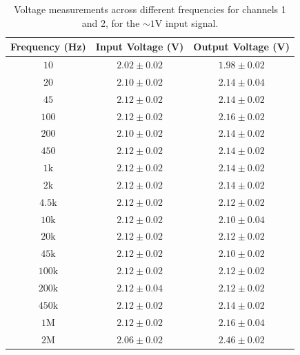 \documentclass[11pt]{article}
\begin{document}
\begin{table}[H]
	\centering
	\begin{tabular}{|c|c|c|}
	\hline
	Frequency (Hz) & Input Voltage (V) & Output Voltage (V)\\
	\hline
	$10$ & $2.02 \pm 0.02$ & $1.98 \pm 0.02$ \\
	$20$ & $2.10 \pm 0.02$ & $2.14 \pm 0.04$ \\
	$45$ & $2.12 \pm 0.02$ & $2.14 \pm 0.02$ \\
	$100$ & $2.12 \pm 0.02$ & $2.16 \pm 0.02$ \\
	$200$ & $2.10 \pm 0.02$ & $2.14 \pm 0.02$ \\
	$450$ & $2.12 \pm 0.02$ & $2.14 \pm 0.02$ \\
	$1\text{k}$ & $2.12 \pm 0.02$ & $2.14 \pm 0.02$ \\
	$2\text{k}$ & $2.12 \pm 0.02$ & $2.14 \pm 0.02$ \\
	$4.5\text{k}$ & $2.12 \pm 0.02$ & $2.12 \pm 0.02$ \\
	$10\text{k}$ & $2.12 \pm 0.02$ & $2.10 \pm 0.04$ \\
	$20\text{k}$ & $2.12 \pm 0.02$ & $2.12 \pm 0.02$ \\
	$45\text{k}$ & $2.12 \pm 0.02$ & $2.10 \pm 0.02$ \\
	$100\text{k}$ & $2.12 \pm 0.02$ & $2.12 \pm 0.02$ \\
	$200\text{k}$ & $2.12 \pm 0.04$ & $2.12 \pm 0.02$ \\
	$450\text{k}$ & $2.12 \pm 0.02$ & $2.14 \pm 0.02$ \\
	$1\text{M}$ & $2.12 \pm 0.02$ & $2.16 \pm 0.04$ \\
	$2\text{M}$ & $2.06 \pm 0.02$ & $2.46 \pm 0.02$ \\
	\hline
	\end{tabular}
	\caption{Voltage measurements across different frequencies for channels 1 and 2,
	for the $\sim 1\si{\volt}$ input signal.}
	\label{tab:voltage_measurements}
\end{table}
\end{document}
